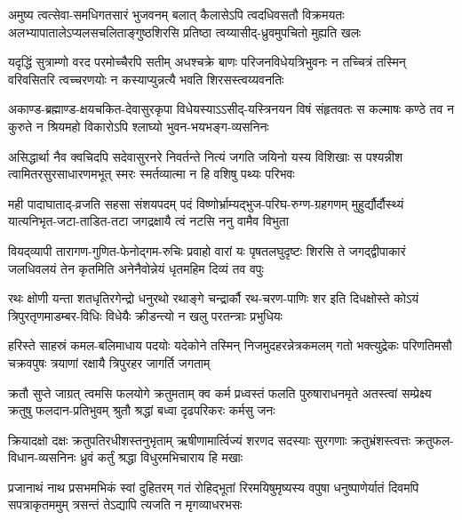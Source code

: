 \fourlineindentedshloka
{अमुष्य त्वत्सेवा-समधिगतसारं भुजवनम्}
{बलात् कैलासेऽपि त्वदधिवसतौ विक्रमयतः}
{अलभ्यापातालेऽप्यलसचलिताङ्गुष्ठशिरसि}
{प्रतिष्ठा त्वय्यासीद्-ध्रुवमुपचितो मुह्यति खलः}%

\fourlineindentedshloka
{यदृद्धिं सुत्राम्णो वरद परमोच्चैरपि सतीम्}
{अधश्चक्रे बाणः परिजनविधेयत्रिभुवनः}
{न तच्चित्रं तस्मिन् वरिवसितरि त्वच्चरणयोः}
{न कस्याप्युन्नत्यै भवति शिरसस्त्वय्यवनतिः}%

\fourlineindentedshloka
{अकाण्ड-ब्रह्माण्ड-क्षयचकित-देवासुरकृपा}
{विधेयस्याऽऽसीद्-यस्त्रिनयन विषं संहृतवतः}
{स कल्माषः कण्ठे तव न कुरुते न श्रियमहो}
{विकारोऽपि श्लाघ्यो भुवन-भयभङ्ग-व्यसनिनः}%

\fourlineindentedshloka
{असिद्धार्था नैव क्वचिदपि सदेवासुरनरे}
{निवर्तन्ते नित्यं जगति जयिनो यस्य विशिखाः}
{स पश्यन्नीश त्वामितरसुरसाधारणमभूत्}
{स्मरः स्मर्तव्यात्मा न हि वशिषु पथ्यः परिभवः}%

\fourlineindentedshloka
{मही पादाघाताद्-व्रजति सहसा संशयपदम्}
{पदं विष्णोर्भ्राम्यद्भुज-परिघ-रुग्ण-ग्रहगणम्}
{मुहुर्द्यौर्दौस्थ्यं यात्यनिभृत-जटा-ताडित-तटा}
{जगद्रक्षायै त्वं नटसि ननु वामैव विभुता}%

\fourlineindentedshloka
{वियद्‍व्यापी तारागण-गुणित-फेनोद्गम-रुचिः}
{प्रवाहो वारां यः पृषतलघुदृष्टः शिरसि ते}
{जगद्द्वीपाकारं जलधिवलयं तेन कृतमिति}
{अनेनैवोन्नेयं धृतमहिम दिव्यं तव वपुः}%

\fourlineindentedshloka
{रथः क्षोणी यन्ता शतधृतिरगेन्द्रो धनुरथो}
{रथाङ्गे चन्द्रार्कौ रथ-चरण-पाणिः शर इति}
{दिधक्षोस्ते कोऽयं त्रिपुरतृणमाडम्बर-विधिः}
{विधेयैः क्रीडन्त्यो न खलु परतन्त्राः प्रभुधियः}%

\fourlineindentedshloka
{हरिस्ते साहस्रं कमल-बलिमाधाय पदयोः}
{यदेकोने तस्मिन् निजमुदहरन्नेत्रकमलम्}
{गतो भक्त्युद्रेकः परिणतिमसौ चक्रवपुषः}
{त्रयाणां रक्षायै त्रिपुरहर  जागर्ति जगताम्}%

\fourlineindentedshloka
{क्रतौ सुप्ते जाग्रत् त्वमसि फलयोगे क्रतुमताम्}
{क्व कर्म प्रध्वस्तं फलति पुरुषाराधनमृते}
{अतस्त्वां सम्प्रेक्ष्य क्रतुषु फलदान-प्रतिभुवम्}
{श्रुतौ श्रद्धां बध्वा दृढपरिकरः कर्मसु जनः}%

\fourlineindentedshloka
{क्रियादक्षो दक्षः क्रतुपतिरधीशस्तनुभृताम्}
{ऋषीणामार्त्विज्यं शरणद सदस्याः सुरगणाः}
{क्रतुभ्रंशस्त्वत्तः क्रतुफल-विधान-व्यसनिनः}
{ध्रुवं कर्तुं श्रद्धा विधुरमभिचाराय हि मखाः}%

\fourlineindentedshloka
{प्रजानाथं नाथ प्रसभमभिकं स्वां दुहितरम्}
{गतं रोहिद्भूतां रिरमयिषुमृष्यस्य वपुषा}
{धनुष्पाणेर्यातं दिवमपि सपत्राकृतममुम्}
{त्रसन्तं तेऽद्यापि त्यजति न मृगव्याधरभसः}%

